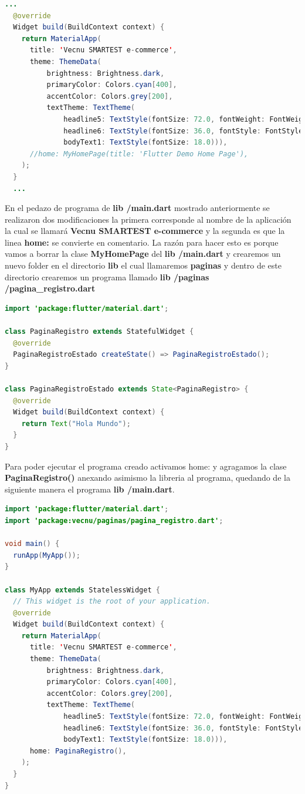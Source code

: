 \begin{lstlisting}[language=java]
...
  @override
  Widget build(BuildContext context) {
    return MaterialApp(
      title: 'Vecnu SMARTEST e-commerce',
      theme: ThemeData(
          brightness: Brightness.dark,
          primaryColor: Colors.cyan[400],
          accentColor: Colors.grey[200],
          textTheme: TextTheme(
              headline5: TextStyle(fontSize: 72.0, fontWeight: FontWeight.bold),
              headline6: TextStyle(fontSize: 36.0, fontStyle: FontStyle.italic),
              bodyText1: TextStyle(fontSize: 18.0))),
      //home: MyHomePage(title: 'Flutter Demo Home Page'),
    );
  }
  ...
\end{lstlisting}

En el pedazo de programa de \textbf{lib /main.dart} mostrado anteriormente se realizaron dos modificaciones la primera corresponde al nombre de la aplicación la cual se llamará \textbf{Vecnu SMARTEST e-commerce} y la segunda es que la linea \textbf{home:} se convierte en comentario. La razón para hacer esto es porque vamos a borrar la clase \textbf{MyHomePage} del \textbf{lib /main.dart} y crearemos un nuevo folder en el directorio \textbf{lib} el cual llamaremos \textbf{paginas} y dentro de este directorio crearemos un programa llamado \textbf{lib /paginas /pagina\_registro.dart}

\begin{lstlisting}[language=java]
import 'package:flutter/material.dart';

class PaginaRegistro extends StatefulWidget {
  @override
  PaginaRegistroEstado createState() => PaginaRegistroEstado();
}

class PaginaRegistroEstado extends State<PaginaRegistro> {
  @override
  Widget build(BuildContext context) {
    return Text("Hola Mundo");
  }
}
\end{lstlisting}

Para poder ejecutar el programa creado activamos home: y agragamos la clase \textbf{PaginaRegistro()} anexando asimismo la libreria al programa, quedando de la siguiente manera el programa \textbf{lib /main.dart}.

\begin{lstlisting}[language=java]
import 'package:flutter/material.dart';
import 'package:vecnu/paginas/pagina_registro.dart';

void main() {
  runApp(MyApp());
}

class MyApp extends StatelessWidget {
  // This widget is the root of your application.
  @override
  Widget build(BuildContext context) {
    return MaterialApp(
      title: 'Vecnu SMARTEST e-commerce',
      theme: ThemeData(
          brightness: Brightness.dark,
          primaryColor: Colors.cyan[400],
          accentColor: Colors.grey[200],
          textTheme: TextTheme(
              headline5: TextStyle(fontSize: 72.0, fontWeight: FontWeight.bold),
              headline6: TextStyle(fontSize: 36.0, fontStyle: FontStyle.italic),
              bodyText1: TextStyle(fontSize: 18.0))),
      home: PaginaRegistro(),
    );
  }
}
\end{lstlisting}

